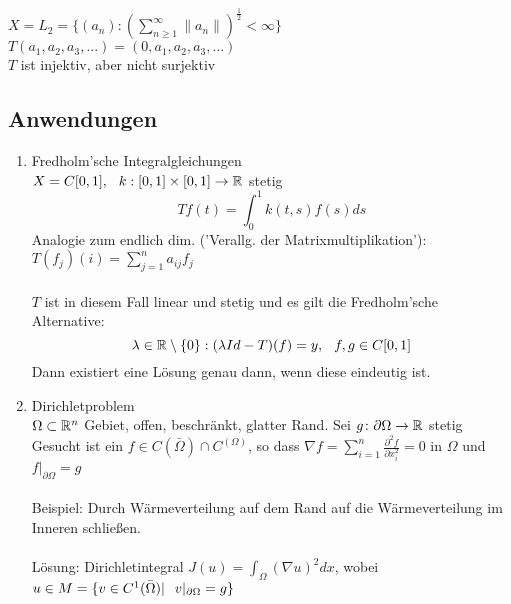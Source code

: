\begin{beispiel}
$X = L_{2} = \{ (a_{n}): \left( \sum_{n \geq 1}^{\infty} \| a_{n} \| \right)^{\frac{1}{2}} < \infty \}$	\\
$T ( a_{1}, a_{2}, a_{3}, ...) = ( 0, a_{1}, a_{2}, a_{3}, ...)$ \\

$T$ ist injektiv, aber nicht surjektiv
\end{beispiel}


\subsection*{Anwendungen}


\begin{enumerate}
	\item Fredholm'sche Integralgleichungen  \\
	$X = C[0, 1], \hspace{0.25cm} k: [0, 1] \times [0, 1] \rightarrow \mathbb{R}$ stetig \\
	\[ Tf(t) = \int_{0}^{1} k(t, s) f(s) ds \]
	Analogie zum endlich dim. ('Verallg. der Matrixmultiplikation'):  $ T(f_{j})(i) = \sum_{j = 1}^{n} a_{ij}f_{j}$ \\ \\
 	$T$ ist in diesem Fall linear und stetig und es gilt die Fredholm'sche Alternative:
	\[ \lambda \in \mathbb{R} \setminus \{0\}: (\lambda Id - T)(f) = y, \hspace{0.25cm} f,g \in C[0, 1] \]
	Dann existiert eine Lösung genau dann, wenn diese eindeutig ist. \\
	\item Dirichletproblem \\
	$\Omega \subset \mathbb{R}^n$ Gebiet, offen, beschränkt, glatter Rand. Sei $g \colon \partial \Omega \rightarrow \mathbb{R}$ stetig \\ 
	Gesucht ist ein $f \in C(\bar \Omega) \cap  C^(\Omega)$, so dass $\nabla f = \sum_{i = 1}^{n} \frac{\partial^{2} f}{\partial x_{i}^2} = 0$ in $\Omega$ und $f|_{\partial \Omega}= g$ \\ \\
	Beispiel: Durch Wärmeverteilung auf dem Rand auf die Wärmeverteilung im Inneren schlie{\ss}en. \\ \\
	Lösung: Dirichletintegral $J(u) = \int_{\Omega} (\nabla u )^{2} dx$, wobei $ u \in M = \{ v \in C^{1}(\bar \Omega) | \hspace{0.25cm} v|_{\partial \Omega} = g \}$ \\

\end{enumerate}
